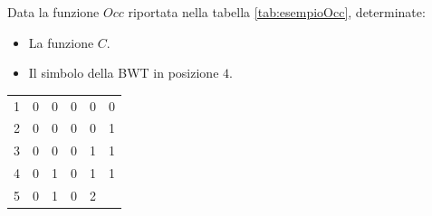 \begin{esempio}
    Data la funzione $Occ$ riportata nella tabella \ref{tab:esempioOcc}, determinate:
    \begin{itemize}
        \item La funzione $C$.
        \item Il simbolo della BWT in posizione $4$.
    \end{itemize}
    \begin{table}[!ht]
        \centering
        \begin{tabular}{cccccc}
            \cline{2-6}
            \multicolumn{1}{c|}{\cellcolor[HTML]{EFEFEF}1}  &
            \multicolumn{1}{c|}{0}                          &
            \multicolumn{1}{c|}{0}                          &
            \multicolumn{1}{c|}{0}                          &
            \multicolumn{1}{c|}{0}                          &
            \multicolumn{1}{c|}{0}                            \\ \cline{2-6}
            \multicolumn{1}{c|}{\cellcolor[HTML]{EFEFEF}2}  &
            \multicolumn{1}{c|}{0}                          &
            \multicolumn{1}{c|}{0}                          &
            \multicolumn{1}{c|}{0}                          &
            \multicolumn{1}{c|}{0}                          &
            \multicolumn{1}{c|}{1}                            \\ \cline{2-6}
            \multicolumn{1}{c|}{\cellcolor[HTML]{EFEFEF}3}  &
            \multicolumn{1}{c|}{0}                          &
            \multicolumn{1}{c|}{0}                          &
            \multicolumn{1}{c|}{0}                          &
            \multicolumn{1}{c|}{1}                          &
            \multicolumn{1}{c|}{1}                            \\ \cline{2-6}
            \multicolumn{1}{c|}{\cellcolor[HTML]{EFEFEF}4}  &
            \multicolumn{1}{c|}{0}                          &
            \multicolumn{1}{c|}{1}                          &
            \multicolumn{1}{c|}{0}                          &
            \multicolumn{1}{c|}{1}                          &
            \multicolumn{1}{c|}{1}                            \\ \cline{2-6}
            \multicolumn{1}{c|}{\cellcolor[HTML]{EFEFEF}5}  &
            \multicolumn{1}{c|}{0}                          &
            \multicolumn{1}{c|}{1}                          &
            \multicolumn{1}{c|}{0}                          &
            \multicolumn{1}{c|}{2}                          &

\end{tabular}
\end{table}
\end{esempio}
